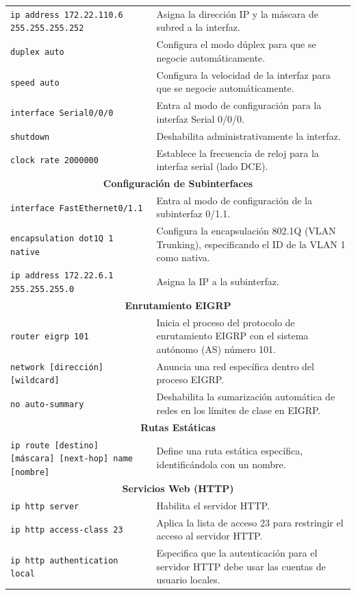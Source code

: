 \documentclass[a5paper]{book}%
\begin{document}
\begin{longtable}{|p{6cm}|p{4cm}|}
\texttt{ip address 172.22.110.6 255.255.255.252} & Asigna la dirección IP y la máscara de subred a la interfaz. \\
\texttt{duplex auto} & Configura el modo dúplex para que se negocie automáticamente. \\
\texttt{speed auto} & Configura la velocidad de la interfaz para que se negocie automáticamente. \\
\texttt{interface Serial0/0/0} & Entra al modo de configuración para la interfaz Serial 0/0/0. \\
\texttt{shutdown} & Deshabilita administrativamente la interfaz. \\
\texttt{clock rate 2000000} & Establece la frecuencia de reloj para la interfaz serial (lado DCE). \\
\multicolumn{2}{|c|}{\textbf{Configuración de Subinterfaces}}\\\hline
\texttt{interface FastEthernet0/1.1} & Entra al modo de configuración de la subinterfaz 0/1.1. \\
\texttt{encapsulation dot1Q 1 native} & Configura la encapsulación 802.1Q (VLAN Trunking), especificando el ID de la VLAN 1 como nativa. \\
\texttt{ip address 172.22.6.1 255.255.255.0} & Asigna la IP a la subinterfaz. \\
\multicolumn{2}{|c|}{\textbf{Enrutamiento EIGRP}}\\\hline
\texttt{router eigrp 101} & Inicia el proceso del protocolo de enrutamiento EIGRP con el sistema autónomo (AS) número 101. \\
\texttt{network [dirección] [wildcard]} & Anuncia una red específica dentro del proceso EIGRP. \\
\texttt{no auto-summary} & Deshabilita la sumarización automática de redes en los límites de clase en EIGRP. \\
\multicolumn{2}{|c|}{\textbf{Rutas Estáticas}}\\\hline
\texttt{ip route [destino] [máscara] [next-hop] name [nombre]} & Define una ruta estática específica, identificándola con un nombre. \\
\multicolumn{2}{|c|}{\textbf{Servicios Web (HTTP)}}\\\hline
\texttt{ip http server} & Habilita el servidor HTTP. \\
\texttt{ip http access-class 23} & Aplica la lista de acceso 23 para restringir el acceso al servidor HTTP. \\
\texttt{ip http authentication local} & Especifica que la autenticación para el servidor HTTP debe usar las cuentas de usuario locales. \\

\end{longtable}
\end{document}
